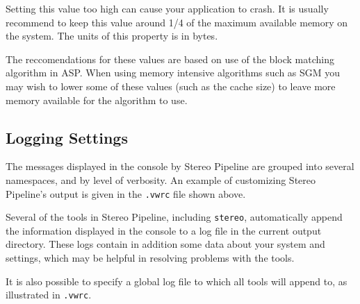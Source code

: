 \begin{description}
Setting this value too high can cause your application to crash. It is
usually recommend to keep this value around 1/4 of the maximum
available memory on the system. The units of this property is in
bytes.

The reccomendations for these values are based on use of the block
matching algorithm in ASP.  When using memory intensive algorithms
such as SGM you may wish to lower some of these values (such as
the cache size) to leave more memory available for the algorithm to use.

\end{description}

\subsection{Logging Settings}
\label{logging}

The messages displayed in the console by Stereo Pipeline are grouped
into several namespaces, and by level of verbosity. An example of
customizing Stereo Pipeline's output is given in the \texttt{.vwrc} file
shown above.

Several of the tools in Stereo Pipeline, including \texttt{stereo},
automatically append the information displayed in the console to a log
file in the current output directory. These logs contain in addition some
data about your system and settings, which may be helpful in resolving
problems with the tools.

It is also possible to specify a global log file to which all tools will
append to, as illustrated in \texttt{.vwrc}.
